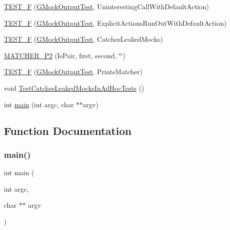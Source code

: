 \begin{DoxyCompactItemize}
\item 
\mbox{\hyperlink{googletest-master_2googlemock_2test_2gmock__output__test___8cc_afcf833faaa33197a2f9815425f101d8c}{T\+E\+S\+T\+\_\+F}} (\mbox{\hyperlink{class_g_mock_output_test}{G\+Mock\+Output\+Test}}, Uninteresting\+Call\+With\+Default\+Action)
\item 
\mbox{\hyperlink{googletest-master_2googlemock_2test_2gmock__output__test___8cc_a885556bf2f15e4a3d2eddac44dd7fc2b}{T\+E\+S\+T\+\_\+F}} (\mbox{\hyperlink{class_g_mock_output_test}{G\+Mock\+Output\+Test}}, Explicit\+Actions\+Run\+Out\+With\+Default\+Action)
\item 
\mbox{\hyperlink{googletest-master_2googlemock_2test_2gmock__output__test___8cc_add20a01035182eac6e1278d06e001d04}{T\+E\+S\+T\+\_\+F}} (\mbox{\hyperlink{class_g_mock_output_test}{G\+Mock\+Output\+Test}}, Catches\+Leaked\+Mocks)
\item 
\mbox{\hyperlink{googletest-master_2googlemock_2test_2gmock__output__test___8cc_ad6a4a921b72d12237933afe1de0c5c51}{M\+A\+T\+C\+H\+E\+R\+\_\+\+P2}} (Is\+Pair, first, second, \char`\"{}\char`\"{})
\item 
\mbox{\hyperlink{googletest-master_2googlemock_2test_2gmock__output__test___8cc_a696afa4fa45b0e98ec9db1fe445fa679}{T\+E\+S\+T\+\_\+F}} (\mbox{\hyperlink{class_g_mock_output_test}{G\+Mock\+Output\+Test}}, Prints\+Matcher)
\item 
void \mbox{\hyperlink{googletest-master_2googlemock_2test_2gmock__output__test___8cc_af634a5c16bccc1861e3fab3181bad4a0}{Test\+Catches\+Leaked\+Mocks\+In\+Ad\+Hoc\+Tests}} ()
\item 
int \mbox{\hyperlink{googletest-master_2googlemock_2test_2gmock__output__test___8cc_a3c04138a5bfe5d72780bb7e82a18e627}{main}} (int argc, char $\ast$$\ast$argv)
\end{DoxyCompactItemize}


\subsection{Function Documentation}
\mbox{\label{googletest-master_2googlemock_2test_2gmock__output__test___8cc_a3c04138a5bfe5d72780bb7e82a18e627}} 
\subsubsection{\texorpdfstring{main()}{main()}}
{\footnotesize\ttfamily int main (\begin{DoxyParamCaption}\item[{int}]{argc,  }\item[{char $\ast$$\ast$}]{argv }\end{DoxyParamCaption})}

